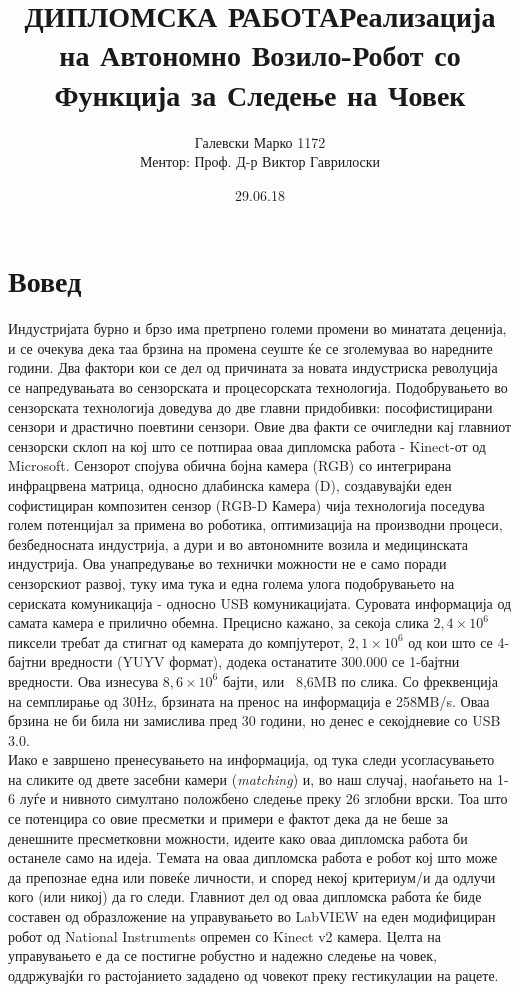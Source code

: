 \documentclass[11pt]{article}
\title{ДИПЛОМСКА РАБОТА\bigbreak \textbf{Реализација на Автономно Возило-Робот со Функција за Следење на Човек}}
\date{29.06.18}
\author{Галевски Марко 1172%
  \\	Ментор: Проф. Д-р Виктор Гаврилоски}
\begin{document}
    \sloppy
    
    \newpage
    \tableofcontents
    \newpage


\section{Вовед}
  Индустријата бурно и брзо има претрпено големи промени во минатата деценија, и се очекува дека таа брзина на промена сеуште ќе се зголемуваа во наредните години. Два фактори кои се дел од причината за новата индустриска револуција се напредувањата во сензорската и процесорската технологија.\bigbreak
  Подобрувањето во сензорската технологија доведува до две главни придобивки: пософистицирани сензори и драстично поевтини сензори. Овие два факти се очигледни кај главниот сензорски склоп на кој што се потпираа оваа дипломска работа - Kinect-от од Microsoft. Сензорот спојува обична бојна камера (RGB) со интегрирана инфрацрвена матрица, односно длабинска камера (D), создавувајќи еден софистициран композитен сензор (RGB-D Камера) чија технологија поседува голем потенцијал за примена во роботика, оптимизација на производни процеси, безбедносната индустрија, а дури и во автономните возила и медицинската индустрија.
  \bigbreak
  Ова унапредување во технички можности не е само поради сензорскиот развој, туку има тука и една голема улога подобрувањето на сериската комуникација - односно USB комуникацијата.
  Суровата информација од самата камера е прилично обемна. Прецисно кажано, за секоја слика $2,4 \times 10^6$ пиксели требат да стигнат од камерата до компјутерот, $2,1 \times 10^6$ од кои што се 4-бајтни вредности (YUYV формат), додека останатите 300.000 се 1-бајтни вредности. Ова изнесува $8,6 \times 10^6$ бајти, или ~8,6MB по слика. Со фреквенција на семплирање од 30Hz, брзината на пренос на информација е 258МB/s. Оваа брзина не би била ни замислива пред 30 години, но денес е секојдневие со USB 3.0.
  \\
  Иако е завршено пренесувањето на информација, од тука следи усогласувањето на сликите од двете засебни камери (\textit{matching}) и, во наш случај, наоѓањето на 1-6 луѓе и нивното симултано положбено следење преку 26 зглобни врски.
  Тоа што се потенцира со овие пресметки и примери е фактот дека да не беше за денешните пресметковни можности, идеите како оваа дипломска работа би останеле само на идеја.
  \bigbreak
  Tемата на оваа дипломска работа е робот кој што може да препознае една или повеќе личности, и според некој критериум/и да одлучи кого (или никој) да го следи.
  Главниот дел од оваа дипломска работа ќе биде составен од образложение на управувањето во LabVIEW на еден модифициран робот од National Instruments опремен со Kinect v2 камера. Целта на управувањето е да се постигне робустно и надежно следење на човек, оддржувајќи го растојанието зададено од човекот преку гестикулации на рацете.
  \\
\end{document}
